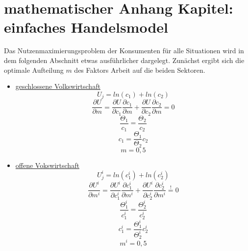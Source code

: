 \chapter{mathematischer Anhang Kapitel: einfaches Handelsmodel}

Das Nutzenmaximierungsproblem der Konsumenten für alle Situationen wird in dem folgenden Abschnitt etwas ausführlicher dargelegt. Zunächst ergibt sich die optimale Aufteilung $m$ des Faktors Arbeit auf die beiden Sektoren.

\begin{itemize}
\item \underline{geschlossene Volkswirtschaft}
\begin{equation} U_j=ln(c_1)+ln(c_2)\end{equation}
\begin{displaymath}\frac{\partial U}{\partial m}=\frac{\partial U}{\partial c_1}\frac{\partial c_1}{\partial m}+\frac{\partial U}{\partial c_2}\frac{\partial c_2}{\partial m}=0\end{displaymath} 
\begin{displaymath}\frac{\Theta_1}{c_1}=\frac{\Theta_2}{c_2}\end{displaymath}
\begin{equation} c_1=\frac{\Theta_1}{\Theta_2}c_2\end{equation}
\begin {equation} m=0,5\end{equation}

\item \underline{offene Vokswirtschaft}
\begin{equation} U^i_j=ln(c^i_1)+ln(c^i_2)\end{equation}
\begin{equation}\frac{\partial U^i}{\partial m^i}=\frac{\partial U^i}{\partial c_1^i}\frac{\partial c_1^i}{\partial m^i}+\frac{\partial U^i}{\partial c_2^i}\frac{\partial c_2^i}{\partial m^i}\overset{!}{=}0\end{equation}
\begin{displaymath} \frac{\Theta_1^i}{c_1^i}=\frac{\Theta_2^i}{c_2^i}\end{displaymath}\begin{equation} c_1^i=\frac{\Theta_1^i}{\Theta_2^i}c_2^i\end{equation}
\begin{equation} m^i=0,5\end{equation}
\end{itemize}


